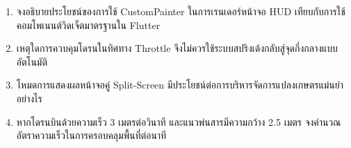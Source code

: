 \begin{enumerate}
    \item จงอธิบายประโยชน์ของการใช้ CustomPainter ในการเรนเดอร์หน้าจอ HUD เทียบกับการใช้คอมโพเนนต์วิดเจ็ตมาตรฐานใน Flutter
    \item เหตุใดการควบคุมโดรนในทิศทาง Throttle จึงไม่ควรใช้ระบบสปริงเด้งกลับสู่จุดกึ่งกลางแบบอัตโนมัติ
    \item โหมดการแสดงผลหน้าจอคู่ Split-Screen มีประโยชน์ต่อการบริหารจัดการแปลงเกษตรแม่นยำอย่างไร
    \item หากโดรนบินด้วยความเร็ว 3 เมตรต่อวินาที และแนวพ่นสารมีความกว้าง 2.5 เมตร จงคำนวณอัตราความเร็วในการครอบคลุมพื้นที่ต่อนาที
\end{enumerate}

\clearpage
